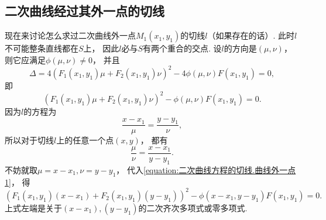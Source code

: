 \subsection{二次曲线经过其外一点的切线}
现在来讨论怎么求过二次曲线外一点\(M_1(x_1,y_1)\)的切线\(l\)（如果存在的话）.
此时\(l\)不可能整条直线都在\(S\)上，
因此\(l\)必与\(S\)有两个重合的交点.
设\(l\)的方向是\((\mu,\nu)\)，
则它应满足\(\phi(\mu,\nu) \neq 0\)，
并且\begin{equation*}
	\Delta
	= 4 (F_1(x_1,y_1) \mu + F_2(x_1,y_1) \nu)^2 - 4 \phi(\mu,\nu) F(x_1,y_1)
	= 0,
\end{equation*}
即\begin{equation}\label{equation:二次曲线方程的切线.曲线外一点1}
	(F_1(x_1,y_1) \mu + F_2(x_1,y_1) \nu)^2 - \phi(\mu,\nu) F(x_1,y_1)
	= 0.
\end{equation}
因为\(l\)的方程为\begin{equation*}
	\frac{x-x_1}{\mu} = \frac{y-y_1}{\nu},
\end{equation*}
所以对于切线\(l\)上的任意一个点\((x,y)\)，
都有\begin{equation*}
	\frac{\mu}{\nu} = \frac{x-x_1}{y-y_1}.
\end{equation*}
不妨就取\(\mu = x-x_1, \nu=y-y_1\)，
代入\cref{equation:二次曲线方程的切线.曲线外一点1}，
得\begin{equation}\label{equation:二次曲线方程的切线.曲线外一点2}
	(F_1(x_1,y_1) (x-x_1) + F_2(x_1,y_1) (y-y_1))^2 - \phi(x-x_1,y-y_1) F(x_1,y_1)
	= 0.
\end{equation}
上式左端是关于\((x-x_1),(y-y_1)\)的二次齐次多项式或零多项式.
